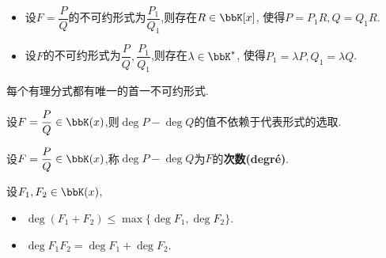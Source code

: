 \begin{prop} $\ $
    \begin{itemize}
        \item 设$F = \dfrac{P}{Q}$的不可约形式为$\dfrac{P_1}{Q_1}$,则存在$R \in \bbK[x]$,
            使得$P = P_1R, Q = Q_1R$.
        \item 设$F$的不可约形式为$\dfrac{P}{Q}, \dfrac{P_1}{Q_1}$,则存在$\lambda \in \bbK^*$,
            使得$P_1 = \lambda P, Q_1 = \lambda Q$.
    \end{itemize}
\end{prop}

\begin{prop}
    每个有理分式都有唯一的首一不可约形式.
\end{prop}

\begin{prop}
    设$F = \dfrac{P}{Q} \in \bbK(x)$,则$\deg P - \deg Q$的值不依赖于代表形式的选取.
\end{prop}

\begin{deff}
    设$F = \dfrac{P}{Q} \in \bbK(x)$,称$\deg P - \deg Q$为$F$的\textbf{次数(degré)}.
\end{deff}

\begin{prop}
    设$F_1, F_2 \in \bbK(x)$,
    \begin{itemize}
        \item $\deg (F_1 + F_2) \leqslant \max \{ \deg F_1, \deg F_2 \}$.
        \item $\deg F_1F_2 = \deg F_1 + \deg F_2$.
    \end{itemize}
\end{prop}

